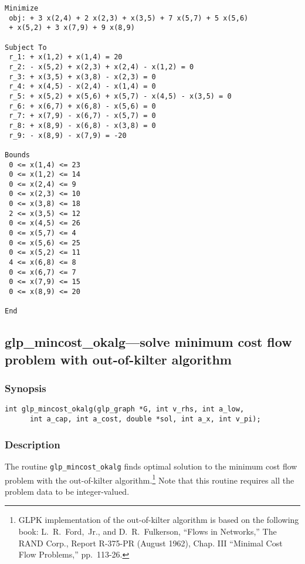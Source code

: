 \documentclass[dvipdfm,11pt]{report}
\begin{document}
\begin{footnotesize}
\begin{verbatim}
Minimize
 obj: + 3 x(2,4) + 2 x(2,3) + x(3,5) + 7 x(5,7) + 5 x(5,6)
 + x(5,2) + 3 x(7,9) + 9 x(8,9)

Subject To
 r_1: + x(1,2) + x(1,4) = 20
 r_2: - x(5,2) + x(2,3) + x(2,4) - x(1,2) = 0
 r_3: + x(3,5) + x(3,8) - x(2,3) = 0
 r_4: + x(4,5) - x(2,4) - x(1,4) = 0
 r_5: + x(5,2) + x(5,6) + x(5,7) - x(4,5) - x(3,5) = 0
 r_6: + x(6,7) + x(6,8) - x(5,6) = 0
 r_7: + x(7,9) - x(6,7) - x(5,7) = 0
 r_8: + x(8,9) - x(6,8) - x(3,8) = 0
 r_9: - x(8,9) - x(7,9) = -20

Bounds
 0 <= x(1,4) <= 23
 0 <= x(1,2) <= 14
 0 <= x(2,4) <= 9
 0 <= x(2,3) <= 10
 0 <= x(3,8) <= 18
 2 <= x(3,5) <= 12
 0 <= x(4,5) <= 26
 0 <= x(5,7) <= 4
 0 <= x(5,6) <= 25
 0 <= x(5,2) <= 11
 4 <= x(6,8) <= 8
 0 <= x(6,7) <= 7
 0 <= x(7,9) <= 15
 0 <= x(8,9) <= 20

End
\end{verbatim}
\end{footnotesize}

\subsection{glp\_mincost\_okalg---solve minimum cost flow problem with
out-of-kilter algorithm}

\subsubsection*{Synopsis}

\begin{verbatim}
int glp_mincost_okalg(glp_graph *G, int v_rhs, int a_low,
      int a_cap, int a_cost, double *sol, int a_x, int v_pi);
\end{verbatim}

\subsubsection*{Description}

The routine \verb|glp_mincost_okalg| finds optimal solution to the
minimum cost flow problem with the out-of-kilter
algorithm.\footnote{GLPK implementation of the out-of-kilter algorithm
is based on the following book: L.~R.~Ford,~Jr., and D.~R.~Fulkerson,
``Flows in Networks,'' The RAND Corp., Report R-375-PR (August 1962),
Chap. III ``Minimal Cost Flow Problems,'' pp.~113-26.} Note that this
routine requires all the problem data to be integer-valued.
\end{document}
